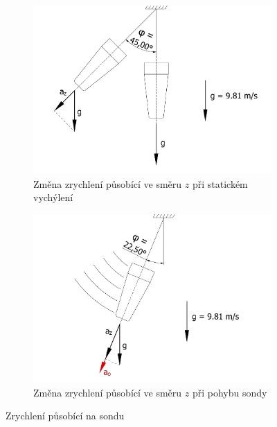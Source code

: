 \documentclass[twoside]{ctuthesis}
\theoremstyle{plain}
\theoremstyle{definition}
\theoremstyle{note}
\begin{document}
		\begin{figure}[hbtp]
			\centering
			\begin{subfigure}{.49\textwidth}
				\centering
				\includegraphics[width=\textwidth]{Figures/sonda_naklon_acc.pdf}
				\caption{Změna zrychlení působící ve směru $z$ při statickém vychýlení}
				\label{fig:sonda:naklon}
			\end{subfigure}%
			\begin{subfigure}{.49\textwidth}
				\centering
				\includegraphics[width=\textwidth]{Figures/sonda_naklon_acc_odst.pdf}
				\caption{Změna zrychlení působící ve směru $z$ při pohybu sondy}
				\label{fig:sonda:naklon:odst}
			\end{subfigure}
			\caption{Zrychlení působící na sondu}
			\label{fig:sonda:naklon:main}
		\end{figure}
\end{document}
